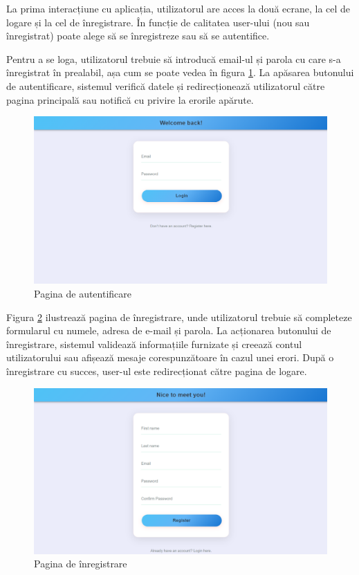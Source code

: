 La prima interacțiune cu aplicația, utilizatorul are acces la două ecrane, la cel de logare și la cel de înregistrare. 
În funcție de calitatea user-ului (nou sau înregistrat) poate alege să se înregistreze sau să se autentifice.
\par
Pentru a se loga, utilizatorul trebuie să introducă email-ul și parola cu care s-a înregistrat în prealabil, așa cum se poate vedea în figura \ref{FigLoginPage}. 
La apăsarea butonului de autentificare, sistemul verifică datele și redirecționează utilizatorul către pagina principală sau notifică cu privire la erorile apărute. 

\begin{figure}[htbp]
	\centering
    \includegraphics[scale=0.35]{./figures/login-page.png}
	\caption{Pagina de autentificare}
	\label{FigLoginPage}
\end{figure}

\par
Figura \ref{FigRegisterPage} ilustrează pagina de înregistrare, unde utilizatorul trebuie să completeze formularul cu numele, adresa de e-mail și parola.
La acționarea butonului de înregistrare, sistemul validează informațiile furnizate și creează contul utilizatorului sau afișează mesaje corespunzătoare în cazul unei erori.
După o înregistrare cu succes, user-ul este redirecționat către pagina de logare.

\begin{figure}[htbp]
	\centering
    \includegraphics[scale=0.35]{./figures/register-page.png}
	\caption{Pagina de înregistrare}
	\label{FigRegisterPage}
\end{figure}

